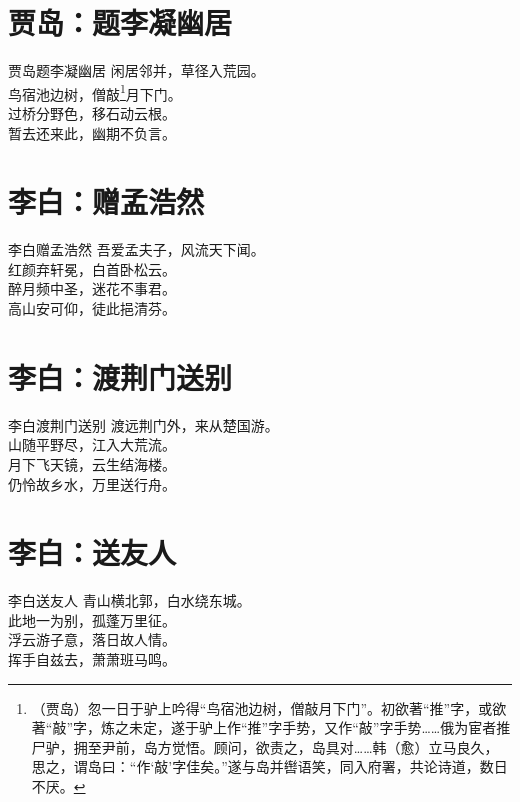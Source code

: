 \documentclass[12pt,oneside,a5paper]{book}
\begin{document}
\chapter{贾岛：题李凝幽居}
\begin{poemzh}{贾岛}{题李凝幽居}
闲居邻并，草径入荒园。\\
鸟宿池边树，僧敲\footnote[1]{（贾岛）忽一日于驴上吟得“鸟宿池边树，僧敲月下门”。初欲著“推”字，或欲著“敲”字，炼之未定，遂于驴上作“推”字手势，又作“敲”字手势……俄为宦者推尸驴，拥至尹前，岛方觉悟。顾问，欲责之，岛具对……韩（愈）立马良久，思之，谓岛曰：“作‘敲’字佳矣。”遂与岛并辔语笑，同入府署，共论诗道，数日不厌。}月下门。\\
过桥分野色，移石动云根。\\
暂去还来此，幽期不负言。\\
\end{poemzh}

\chapter{李白：赠孟浩然}
\begin{poemzh}{李白}{赠孟浩然}
吾爱孟夫子，风流天下闻。\\
红颜弃轩冕，白首卧松云。\\
醉月频中圣，迷花不事君。\\
高山安可仰，徒此挹清芬。\\ 
\end{poemzh}

\chapter{李白：渡荆门送别}
\begin{poemzh}{李白}{渡荆门送别}
渡远荆门外，来从楚国游。\\
山随平野尽，江入大荒流。\\
月下飞天镜，云生结海楼。\\
仍怜故乡水，万里送行舟。\\ 
\end{poemzh}

\chapter{李白：送友人}
\begin{poemzh}{李白}{送友人}
青山横北郭，白水绕东城。\\
此地一为别，孤蓬万里征。\\
浮云游子意，落日故人情。\\
挥手自兹去，萧萧班马鸣。\\ 
\end{poemzh}
\end{document}
